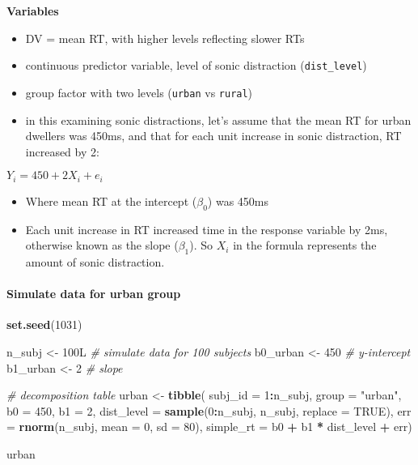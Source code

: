 \documentclass[
]{article}
\newenvironment{Shaded}{\begin{snugshade}}{\end{snugshade}}
\newcommand{\AttributeTok}[1]{\textcolor[rgb]{0.13,0.29,0.53}{#1}}
\newcommand{\CommentTok}[1]{\textcolor[rgb]{0.56,0.35,0.01}{\textit{#1}}}
\newcommand{\ConstantTok}[1]{\textcolor[rgb]{0.56,0.35,0.01}{#1}}
\newcommand{\DecValTok}[1]{\textcolor[rgb]{0.00,0.00,0.81}{#1}}
\newcommand{\FunctionTok}[1]{\textcolor[rgb]{0.13,0.29,0.53}{\textbf{#1}}}
\newcommand{\NormalTok}[1]{#1}
\newcommand{\OtherTok}[1]{\textcolor[rgb]{0.56,0.35,0.01}{#1}}
\newcommand{\SpecialCharTok}[1]{\textcolor[rgb]{0.81,0.36,0.00}{\textbf{#1}}}
\newcommand{\StringTok}[1]{\textcolor[rgb]{0.31,0.60,0.02}{#1}}
\providecommand{\tightlist}{%
  \setlength{\itemsep}{0pt}\setlength{\parskip}{0pt}}
\begin{document}
\textbf{Variables}

\begin{itemize}
\tightlist
\item
  DV = mean RT, with higher levels reflecting slower RTs
\item
  continuous predictor variable, level of sonic distraction
  (\texttt{dist\_level})
\item
  group factor with two levels (\texttt{urban} vs \texttt{rural})
\item
  in this examining sonic distractions, let's assume that the mean RT
  for urban dwellers was 450ms, and that for each unit increase in sonic
  distraction, RT increased by 2:
\end{itemize}

\(Y_{i} = 450 + 2X_{i} + e_{i}\)

\begin{itemize}
\tightlist
\item
  Where mean RT at the intercept (\(\beta_{0}\)) was 450ms
\item
  Each unit increase in RT increased time in the response variable by
  2ms, otherwise known as the slope (\(\beta_{1}\)). So \(X_{i}\) in the
  formula represents the amount of sonic distraction.
\end{itemize}

\hypertarget{simulate-data-for-urban-group}{%
\paragraph{Simulate data for urban
group}\label{simulate-data-for-urban-group}}

\begin{Shaded}
\begin{Highlighting}[]
\FunctionTok{set.seed}\NormalTok{(}\DecValTok{1031}\NormalTok{)}

\NormalTok{n\_subj }\OtherTok{\textless{}{-}}\NormalTok{ 100L  }\CommentTok{\# simulate data for 100 subjects}
\NormalTok{b0\_urban }\OtherTok{\textless{}{-}} \DecValTok{450} \CommentTok{\# y{-}intercept}
\NormalTok{b1\_urban }\OtherTok{\textless{}{-}} \DecValTok{2}   \CommentTok{\# slope}

\CommentTok{\# decomposition table}
\NormalTok{urban }\OtherTok{\textless{}{-}} \FunctionTok{tibble}\NormalTok{(}
  \AttributeTok{subj\_id =} \DecValTok{1}\SpecialCharTok{:}\NormalTok{n\_subj,}
  \AttributeTok{group =} \StringTok{"urban"}\NormalTok{,}
  \AttributeTok{b0 =} \DecValTok{450}\NormalTok{,}
  \AttributeTok{b1 =} \DecValTok{2}\NormalTok{,}
  \AttributeTok{dist\_level =} \FunctionTok{sample}\NormalTok{(}\DecValTok{0}\SpecialCharTok{:}\NormalTok{n\_subj, n\_subj, }\AttributeTok{replace =} \ConstantTok{TRUE}\NormalTok{),}
  \AttributeTok{err =} \FunctionTok{rnorm}\NormalTok{(n\_subj, }\AttributeTok{mean =} \DecValTok{0}\NormalTok{, }\AttributeTok{sd =} \DecValTok{80}\NormalTok{),}
  \AttributeTok{simple\_rt =}\NormalTok{ b0 }\SpecialCharTok{+}\NormalTok{ b1 }\SpecialCharTok{*}\NormalTok{ dist\_level }\SpecialCharTok{+}\NormalTok{ err)}

\NormalTok{urban}
\end{Highlighting}
\end{Shaded}
\end{document}
